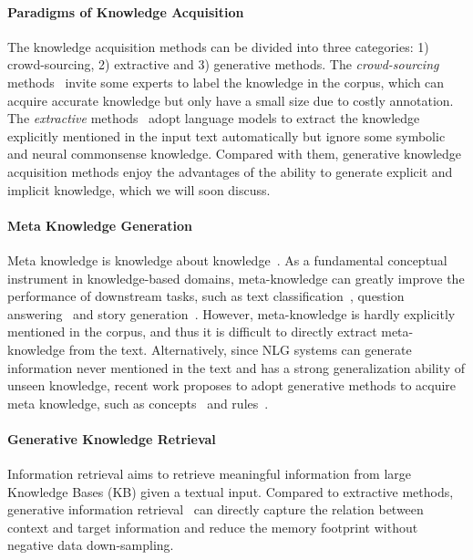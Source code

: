 \paragraph{Paradigms of Knowledge Acquisition}

The knowledge acquisition methods can be divided into three categories: 1) crowd-sourcing, 2) extractive and 3) generative methods.
The \textit{crowd-sourcing} methods~\cite{10.1145/219717.219748} invite some experts to label the knowledge in the corpus, which can acquire accurate knowledge but only have a small size due to costly annotation.
The \textit{extractive} methods~\cite{zhou2022survey} adopt language models to extract the knowledge explicitly mentioned in the input text automatically but ignore some symbolic and neural commonsense knowledge.
Compared with them, generative knowledge acquisition methods enjoy the advantages of the ability to generate explicit and implicit knowledge, which we will soon discuss.


\paragraph{Meta Knowledge Generation}
Meta knowledge is knowledge about knowledge~\cite{Davis1977MetaLevelKO}.
As a fundamental conceptual instrument in knowledge-based domains, meta-knowledge can greatly improve the performance of downstream tasks, such as text classification~\cite{chen2019deep}, question answering~\cite{garderes-etal-2020-conceptbert} and story generation~\cite{chen2021commonsense}.
However, meta-knowledge is hardly explicitly mentioned in the corpus, and thus it is difficult to directly extract meta-knowledge from the text.
Alternatively, since NLG systems can generate information never mentioned in the text and has a strong generalization ability of unseen knowledge, recent work proposes to adopt generative methods to acquire meta knowledge, such as concepts~\cite{chen-etal-2019-ensuring,9409694} and rules~\cite{10.1016/j.knosys.2022.108371}.

\paragraph{Generative Knowledge Retrieval}
Information retrieval aims to retrieve meaningful information from large Knowledge Bases (KB) given a textual input.
Compared to extractive methods, generative information retrieval~\cite{cao2021autoregressive,10.1162/tacl_a_00460,rossiello2021generative} can directly capture the relation between context and target information and reduce the memory footprint without negative data down-sampling.


